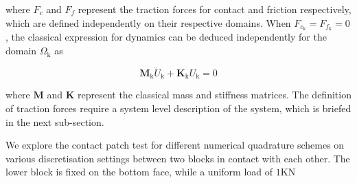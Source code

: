 
where $F_{c}$ and $F_{f}$ represent the traction forces for contact and friction respectively, which are defined independently on their respective domains. When $F_{c_\mathrm{k}}=F_{f_\mathrm{k}}=0$, the classical expression for dynamics can be deduced independently for the domain $\Omega_\mathrm{k}$ as

\begin{equation}
    \mathbf{M}_\mathrm{k}\ddot{U}_\mathrm{k}+\mathbf{K}_\mathrm{k}U_\mathrm{k}=0
\end{equation}

where $\mathbf{M}$ and $\mathbf{K}$ represent the classical mass and stiffness matrices. The definition of traction forces require a system level description of the system, which is briefed in the next sub-section.
\fi

    
    
    
    We explore the contact patch test for different numerical quadrature schemes on various discretisation settings between two blocks in contact with each other.
    The lower block is fixed on the bottom face, while a uniform load of $1 \mathrm{K N}$
    
    
